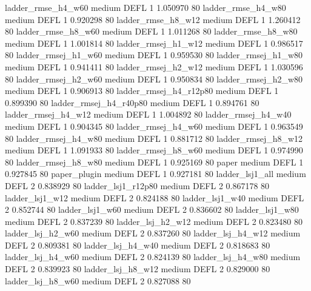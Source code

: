     ladder_rmse_h4_w60     medium     DEFL                 1 1.050970 80
    ladder_rmse_h4_w80     medium     DEFL                 1 0.920298 80
    ladder_rmse_h8_w12     medium     DEFL                 1 1.260412 80
    ladder_rmse_h8_w60     medium     DEFL                 1 1.011268 80
    ladder_rmse_h8_w80     medium     DEFL                 1 1.001814 80
   ladder_rmsej_h1_w12     medium     DEFL                 1 0.986517 80
   ladder_rmsej_h1_w60     medium     DEFL                 1 0.959530 80
   ladder_rmsej_h1_w80     medium     DEFL                 1 0.941411 80
   ladder_rmsej_h2_w12     medium     DEFL                 1 1.030596 80
   ladder_rmsej_h2_w60     medium     DEFL                 1 0.950834 80
   ladder_rmsej_h2_w80     medium     DEFL                 1 0.906913 80
ladder_rmsej_h4_r12p80     medium     DEFL                 1 0.899390 80
ladder_rmsej_h4_r40p80     medium     DEFL                 1 0.894761 80
   ladder_rmsej_h4_w12     medium     DEFL                 1 1.004892 80
   ladder_rmsej_h4_w40     medium     DEFL                 1 0.904345 80
   ladder_rmsej_h4_w60     medium     DEFL                 1 0.963549 80
   ladder_rmsej_h4_w80     medium     DEFL                 1 0.881712 80
   ladder_rmsej_h8_w12     medium     DEFL                 1 1.091933 80
   ladder_rmsej_h8_w60     medium     DEFL                 1 0.974990 80
   ladder_rmsej_h8_w80     medium     DEFL                 1 0.925169 80
                 paper     medium     DEFL                 1 0.927845 80
          paper_plugin     medium     DEFL                 1 0.927181 80
       ladder_lsj1_all     medium     DEFL                 2 0.838929 80
    ladder_lsj1_r12p80     medium     DEFL                 2 0.867178 80
       ladder_lsj1_w12     medium     DEFL                 2 0.824188 80
       ladder_lsj1_w40     medium     DEFL                 2 0.852744 80
       ladder_lsj1_w60     medium     DEFL                 2 0.836602 80
       ladder_lsj1_w80     medium     DEFL                 2 0.837239 80
     ladder_lsj_h2_w12     medium     DEFL                 2 0.823480 80
     ladder_lsj_h2_w60     medium     DEFL                 2 0.837260 80
     ladder_lsj_h4_w12     medium     DEFL                 2 0.809381 80
     ladder_lsj_h4_w40     medium     DEFL                 2 0.818683 80
     ladder_lsj_h4_w60     medium     DEFL                 2 0.824139 80
     ladder_lsj_h4_w80     medium     DEFL                 2 0.839923 80
     ladder_lsj_h8_w12     medium     DEFL                 2 0.829000 80
     ladder_lsj_h8_w60     medium     DEFL                 2 0.827088 80
